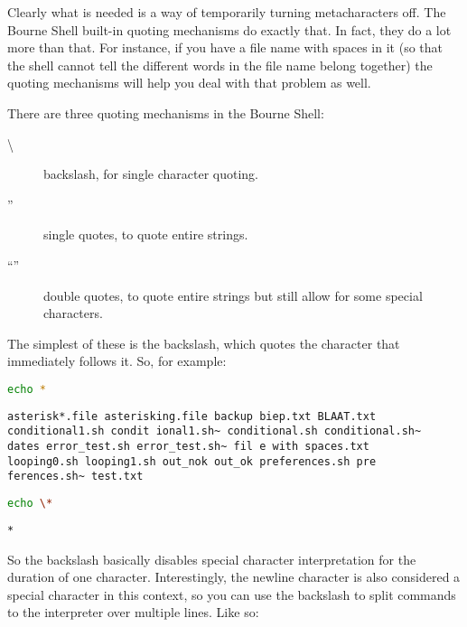 Clearly what is needed is a way of temporarily turning metacharacters off. The
Bourne Shell built-in quoting mechanisms do exactly that. In fact, they do a
lot more than that. For instance, if you have a file name with spaces in it (so
that the shell cannot tell the different words in the file name belong
together) the quoting mechanisms will help you deal with that problem as well.

There are three quoting mechanisms in the Bourne Shell:

\begin{description}
	\item[\textbackslash{}] backslash, for single character quoting.
	\item[''] single quotes, to quote entire strings.
	\item[``''] double quotes, to quote entire strings but still allow for some special characters.
\end{description}

The simplest of these is the backslash, which quotes the character that
immediately follows it. So, for example:

\lstset{basicstyle=\scriptsize, numbers=left, captionpos=b, tabsize=4}
\begin{lstlisting}[caption=Echo with an asterisk,language={bash},
breaklines=true,xleftmargin=15pt,label=lst:Echo with an asterisk]
echo *
\end{lstlisting}

\scriptsize
\begin{verbatim}
asterisk*.file asterisking.file backup biep.txt BLAAT.txt 
conditional1.sh condit ional1.sh~ conditional.sh conditional.sh~ 
dates error_test.sh error_test.sh~ fil e with spaces.txt 
looping0.sh looping1.sh out_nok out_ok preferences.sh pre
ferences.sh~ test.txt
\end{verbatim}
\normalsize

\lstset{basicstyle=\scriptsize, numbers=left, captionpos=b, tabsize=4}
\begin{lstlisting}[caption=Echoing an asterisk,language={bash},
breaklines=true,xleftmargin=15pt,label=lst:Echoing an asterisk]
echo \*
\end{lstlisting}

\scriptsize
\begin{verbatim}
*
\end{verbatim}
\normalsize

So the backslash basically disables special character interpretation for the
duration of one character. Interestingly, the newline character is also
considered a special character in this context, so you can use the backslash to
split commands to the interpreter over multiple lines. Like so:

